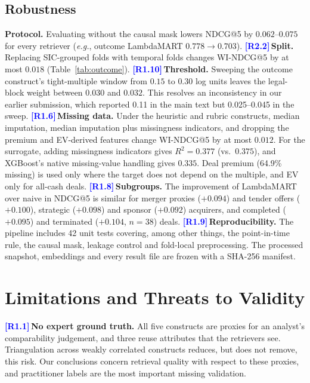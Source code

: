 \documentclass[conference]{IEEEtran}
\newcommand{\eg}{\textit{e.g.}}
\newcommand{\rc}[1]{\textcolor{blue}{\textbf{[#1]}}\,}
\newcommand{\rc}[1]{}
\begin{document}
\subsection{Robustness}
\label{sec:robustness}

\noindent\textbf{Protocol.} Evaluating without the causal mask lowers NDCG@5 by $0.062$--$0.075$ for every retriever (\eg, outcome LambdaMART $0.778\to0.703$).
\rc{R2.2}\noindent\textbf{Split.} Replacing SIC-grouped folds with temporal folds changes WI-NDCG@5 by at most $0.018$ (Table~\ref{tab:outcome}).
\rc{R1.10}\noindent\textbf{Threshold.} Sweeping the outcome construct's tight-multiple window from $0.15$ to $0.30$ log units leaves the legal-block weight between $0.030$ and $0.032$. This resolves an inconsistency in our earlier submission, which reported 0.11 in the main text but 0.025--0.045 in the sweep.
\rc{R1.6}\noindent\textbf{Missing data.} Under the heuristic and rubric constructs, median imputation, median imputation plus missingness indicators, and dropping the premium and EV-derived features change WI-NDCG@5 by at most $0.012$. For the surrogate, adding missingness indicators gives $R^2=0.377$ (vs.\ $0.375$), and XGBoost's native missing-value handling gives $0.335$. Deal premium (64.9\% missing) is used only where the target does not depend on the multiple, and EV only for all-cash deals.
\rc{R1.8}\noindent\textbf{Subgroups.} The improvement of LambdaMART over naive in NDCG@5 is similar for merger proxies ($+0.094$) and tender offers ($+0.100$), strategic ($+0.098$) and sponsor ($+0.092$) acquirers, and completed ($+0.095$) and terminated ($+0.104$, $n=38$) deals.
\rc{R1.9}\noindent\textbf{Reproducibility.} The pipeline includes 42 unit tests covering, among other things, the point-in-time rule, the causal mask, leakage control and fold-local preprocessing. The processed snapshot, embeddings and every result file are frozen with a SHA-256 manifest.

\section{Limitations and Threats to Validity}
\label{sec:limitations}

\rc{R1.1}\noindent\textbf{No expert ground truth.} All five constructs are proxies for an analyst's comparability judgement, and three reuse attributes that the retrievers see. Triangulation across weakly correlated constructs reduces, but does not remove, this risk. Our conclusions concern retrieval quality with respect to these proxies, and practitioner labels are the most important missing validation.
\end{document}
